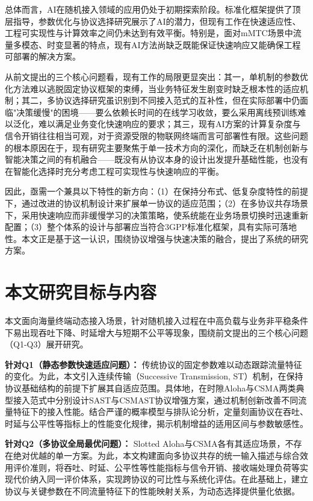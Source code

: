 总体而言，AI在随机接入领域的应用仍处于初期探索阶段。标准化框架提供了顶层指导，参数优化与协议选择研究展示了AI的潜力，但现有工作在快速适应性、工程可实现性与计算效率之间仍未达到有效平衡。特别是，面对mMTC场景中流量多模态、时变显著的特点，现有AI方法尚缺乏既能保证快速响应又能确保工程可部署的解决方案。

从前文提出的三个核心问题看，现有工作的局限更显突出：其一，单机制的参数优化方法难以逃脱固定协议框架的束缚，当业务特征发生剧变时缺乏根本性的适应机制；其二，多协议选择研究虽识别到不同接入范式的互补性，但在实际部署中仍面临"决策缓慢"的困境——要么依赖长时间的在线学习收敛，要么采用离线预训练难以泛化，难以满足业务变化快速响应的要求；其三，现有AI方案的计算复杂度与信令开销往往相当可观，对于资源受限的物联网终端而言可部署性有限。这些问题的根本原因在于，现有研究主要聚焦于单一技术方向的深化，而缺乏在机制创新与智能决策之间的有机融合——既没有从协议本身的设计出发提升基础性能，也没有在智能化选择时充分考虑工程可实现性与快速响应的平衡。

因此，亟需一个兼具以下特性的新方向：（1）在保持分布式、低复杂度特性的前提下，通过改进的协议机制设计来扩展单一协议的适应范围；（2）在多协议共存场景下，采用快速响应而非缓慢学习的决策策略，使系统能在业务场景切换时迅速重新配置；（3）整个体系的设计与部署应当符合3GPP标准化框架，具有实际可落地性。本文正是基于这一认识，围绕协议增强与快速决策的融合，提出了系统的研究方案。


\section{本文研究目标与内容}
\label{sec:work_overview}

本文面向海量终端动态接入场景，针对随机接入过程在中高负载与业务非平稳条件下易出现吞吐下降、时延增大与短期不公平等现象，围绕前文提出的三个核心问题（Q1-Q3）展开研究。

\noindent\textbf{针对Q1（静态参数快速适应问题）：}
传统协议的固定参数难以动态跟踪流量特征的变化。为此，本文引入连续传输（Successive Transmission, ST）机制，在保持协议基础结构的前提下扩展其自适应范围。具体地，在时隙Aloha与CSMA两类典型接入范式中分别设计SAST与CSMAST协议增强方案，通过机制创新改善不同流量特征下的接入性能。结合严谨的概率模型与排队论分析，定量刻画协议在吞吐、时延与公平性等指标上的性能变化规律，揭示机制增益的适用区间与参数敏感性。

\noindent\textbf{针对Q2（多协议全局最优问题）：}
Slotted Aloha与CSMA各有其适应场景，不存在绝对优越的单一方案。为此，本文构建面向多协议共存的统一输入描述与综合效用评价准则，将吞吐、时延、公平性等性能指标与信令开销、接收端处理负荷等实现代价纳入同一评价体系，实现跨协议的可比性与系统化评估。在此基础上，建立协议与关键参数在不同流量特征下的性能映射关系，为动态选择提供量化依据。

